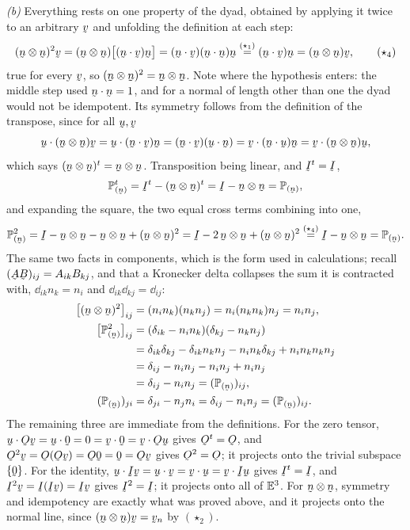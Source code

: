\begin{solution}
\emph{(b)} Everything rests on one property of the dyad, obtained by
applying it twice to an arbitrary $\bv$ and unfolding the definition at each
step:
\begin{equation}
   (\bn\otimes\bn)^{2}\bv=(\bn\otimes\bn)\big[(\ip\bn\bv)\bn\big]
   =(\ip\bn\bv)(\ip\bn\bn)\bn
   \overset{(\star_1)}{=}(\ip\bn\bv)\bn=(\bn\otimes\bn)\bv , \tag{$\star_4$}
\end{equation}
true for every $\bv$, so $(\bn\otimes\bn)^{2}=\bn\otimes\bn$. Note where the
hypothesis enters: the middle step used $\ip\bn\bn=1$, and for a normal of
length other than one the dyad would not be idempotent. Its symmetry follows
from the definition of the transpose, since for all $\bu,\bv$
\[
   \ip\bu{(\bn\otimes\bn)\bv}=\ip{\bu}{(\ip\bn\bv)\bn}
   =(\ip\bn\bv)(\ip\bu\bn)=\ip\bv{(\ip\bn\bu)\bn}
   =\ip\bv{(\bn\otimes\bn)\bu},
\]
which says $(\bn\otimes\bn)^{t}=\bn\otimes\bn$. Transposition being linear,
and $\I^{t}=\I$,
\[
   \Proj{\bn}^{t}=\I^{t}-(\bn\otimes\bn)^{t}=\I-\bn\otimes\bn=\Proj{\bn},
\]
and expanding the square, the two equal cross terms combining into one,
\[
   \Proj{\bn}^{2}=\I-\bn\otimes\bn-\bn\otimes\bn+(\bn\otimes\bn)^{2}
   =\I-2\,\bn\otimes\bn+(\bn\otimes\bn)^{2}
   \overset{(\star_4)}{=}\I-\bn\otimes\bn=\Proj{\bn}.
\]
The same two facts in components, which is the form used in calculations;
recall $(\bA\bB)_{ij}=A_{ik}B_{kj}$, and that a Kronecker delta collapses
the sum it is contracted with, $\dd_{ik}n_k=n_i$ and
$\dd_{ik}\dd_{kj}=\dd_{ij}$:
\[
\begin{aligned}
   \big[(\bn\otimes\bn)^{2}\big]_{ij}&=(n_in_k)(n_kn_j)
   =n_i(n_kn_k)n_j=n_in_j,\\
   \big[\Proj{\bn}^{2}\big]_{ij}&=(\dd_{ik}-n_in_k)(\dd_{kj}-n_kn_j)\\
   &=\dd_{ik}\dd_{kj}-\dd_{ik}n_kn_j-n_in_k\dd_{kj}+n_in_k n_kn_j\\
   &=\dd_{ij}-n_in_j-n_in_j+n_in_j\\
   &=\dd_{ij}-n_in_j=(\Proj{\bn})_{ij},\\
   (\Proj{\bn})_{ji}&=\dd_{ji}-n_jn_i=\dd_{ij}-n_in_j=(\Proj{\bn})_{ij}.
\end{aligned}
\]
The remaining three are immediate from the definitions. For the zero tensor,
$\ip\bu{\Ob\bv}=\ip\bu\bze=0=\ip\bv\bze=\ip\bv{\Ob\bu}$ gives $\Ob^{t}=\Ob$,
and $\Ob^{2}\bv=\Ob(\Ob\bv)=\Ob\bze=\bze=\Ob\bv$ gives $\Ob^{2}=\Ob$; it
projects onto the trivial subspace $\{\bze\}$. For the identity,
$\ip\bu{\I\bv}=\ip\bu\bv=\ip\bv\bu=\ip\bv{\I\bu}$ gives $\I^{t}=\I$, and
$\I^{2}\bv=\I(\I\bv)=\I\bv$ gives $\I^{2}=\I$; it projects onto all of
$\mathbb{E}^{3}$. For $\bn\otimes\bn$, symmetry and idempotency are exactly what was
proved above, and it projects onto the normal line, since
$(\bn\otimes\bn)\bv=\bv_n$ by $(\star_2)$.



\end{solution}
